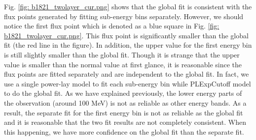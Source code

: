 \documentclass[12pt]{report}
\begin{document}
            Fig. \ref{fig: b1821_twolayer_cur.png} shows that the global fit is consistent with 
            the flux points generated by fitting sub-energy bins separately. However, 
            we should notice the first flux point 
            which is denoted as a blue square in Fig. \ref{fig: b1821_twolayer_cur.png}. This 
            flux point is significantly smaller than the global fit (the red line in the figure). 
            In addition, the upper value for the first energy bin is still slightly smaller than the global fit. 
            Though it is strange that the upper value is smaller than the normal value at first glance, 
            it is reasonable since the flux points are fitted separately and are independent to 
            the global fit. In fact, we use a single power-lay model to fit each sub-energy bin while PLExpCutoff
            model to do the global fit. As we have explained previously, the lower energy parts of the 
            observation (around 100 MeV) is not as reliable as other energy bands. As a result, the separate 
            fit for the first energy bin
            is not as reliable as the global fit and it is reasonable that the two fit results are not completely
            consistent. When this happening, we have more confidence on the global fit than the separate fit.
            
\end{document}
